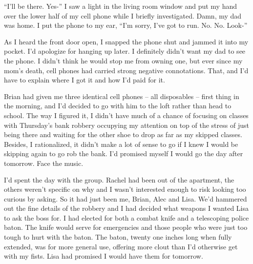 





``I'll be there.  Yes-'' I saw a light in the living room window and put my hand over the lower half of my cell phone while I briefly investigated.  Damn, my dad was home.  I put the phone to my ear, ``I'm sorry, I've got to run.  No.  No.  Look-''



As I heard the front door open, I snapped the phone shut and jammed it into my pocket.  I'd apologize for hanging up later.  I definitely didn't want my dad to see the phone.  I didn't think he would stop me from owning one, but ever since my mom's death, cell phones had carried strong negative connotations.  That, and I'd have to explain where I got it and how I'd paid for it.



Brian had given me three identical cell phones – all disposables – first thing in the morning, and I'd decided to go with him to the loft rather than head to school.  The way I figured it, I didn't have much of a chance of focusing on classes with Thursday's bank robbery occupying my attention on top of the stress of just being there and waiting for the other shoe to drop as far as my skipped classes.  Besides, I rationalized, it didn't make a lot of sense to go if I knew I would be skipping again to go rob the bank.  I'd promised myself I would go the day after tomorrow.  Face the music.



I'd spent the day with the group.  Rachel had been out of the apartment, the others weren't specific on why and I wasn't interested enough to risk looking too curious by asking.  So it had just been me, Brian, Alec and Lisa.  We'd hammered out the fine details of the robbery and I had decided what weapons I wanted Lisa to ask the boss for.  I had elected for both a combat knife and a telescoping police baton.  The knife would serve for emergencies and those people who were just too tough to hurt with the baton.  The baton, twenty one inches long when fully extended, was for more general use, offering more clout than I'd otherwise get with my fists.  Lisa had promised I would have them for tomorrow.



